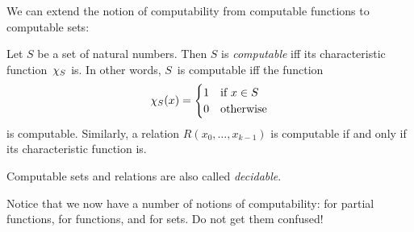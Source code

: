 \documentclass[../../../include/open-logic-section]{subfiles}
\begin{document}

We can extend the notion of computability from computable functions to
computable sets:

\begin{defn}
  Let $S$ be a set of natural numbers. Then $S$ is \emph{computable}
  iff its characteristic function~$\chi_{S}$ is. In other words,
  $S$~is computable iff the function
\[
\chi_{S}(x) =
\begin{cases}
1 & \text{if $x \in S$} \\
0 & \text{otherwise}
\end{cases}
\]
is computable. Similarly, a relation $R(x_0, \dots, x_{k-1})$ is
computable if and only if its characteristic function is.

Computable sets and relations are also called \emph{decidable}.
\end{defn}

\begin{explain}
Notice that we now have a number of notions of computability: for
partial functions, for functions, and for sets. Do not get them
confused!{} 
\end{explain}
\end{document}
